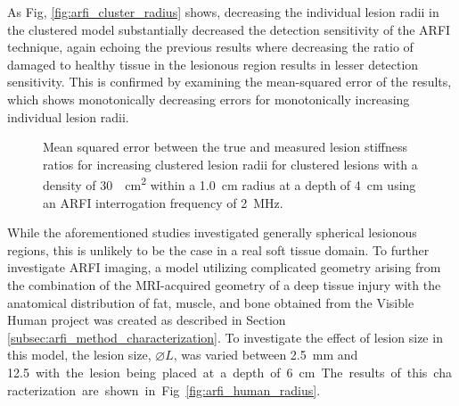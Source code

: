 			As Fig, \ref{fig:arfi_cluster_radius} shows, decreasing the individual lesion radii in the clustered model substantially decreased the detection sensitivity of the ARFI technique, again echoing the previous results where decreasing the ratio of damaged to healthy tissue in the lesionous region results in lesser detection sensitivity. This is confirmed by examining the mean-squared error of the results, which shows monotonically decreasing errors for monotonically increasing individual lesion radii.

			\begin{figure}[!htb]
				\centering
				\caption[ARFI imaging-acquired lesion stiffness mean squared error related to small lesion cluster density]{Mean squared error between the true and measured lesion stiffness ratios for increasing clustered lesion radii for clustered lesions with a density of \SI{30}{\per\cm\squared} within a \SI{1.0}{cm} radius at a depth of \SI{4}{\cm} using an ARFI interrogation frequency of \SI{2}{\MHz}.}
				\label{fig:arfi_cluster_radius_mse}
			\end{figure}

			While the aforementioned studies investigated generally spherical lesionous regions, this is unlikely to be the case in a real soft tissue domain. To further investigate ARFI imaging, a model utilizing complicated geometry arising from the combination of the MRI-acquired geometry of a deep tissue injury with the anatomical distribution of fat, muscle, and bone obtained from the Visible Human project \cite{visiblehuman} was created as described in Section \ref{subsec:arfi_method_characterization}. To investigate the effect of lesion size in this model, the lesion size, $\diameter L$, was varied between \SI{2.5}{\mm} and \SI{12.5} with the lesion being placed at a depth of \SI{6}{\cm}. The results of this characterization are shown in Fig. \ref{fig:arfi_human_radius}.

